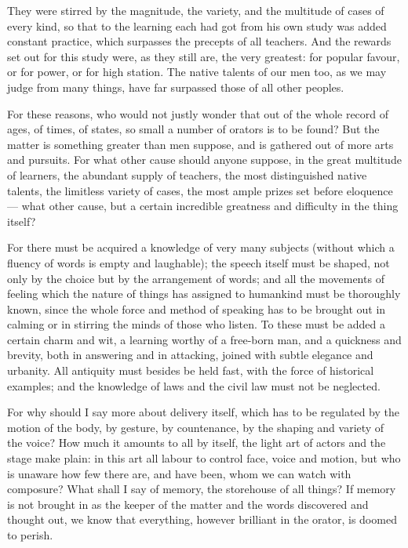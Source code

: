  They were stirred by the magnitude, the variety, and the multitude of cases of every kind, so that to the learning each had got from his own study was added constant practice, which surpasses the precepts of all teachers. And the rewards set out for this study were, as they still are, the very greatest: for popular favour, or for power, or for high station. The native talents of our men too, as we may judge from many things, have far surpassed those of all other peoples.

 For these reasons, who would not justly wonder that out of the whole record of ages, of times, of states, so small a number of orators is to be found? But the matter is something greater than men suppose, and is gathered out of more arts and pursuits. For what other cause should anyone suppose, in the great multitude of learners, the abundant supply of teachers, the most distinguished native talents, the limitless variety of cases, the most ample prizes set before eloquence — what other cause, but a certain incredible greatness and difficulty in the thing itself?

 For there must be acquired a knowledge of very many subjects (without which a fluency of words is empty and laughable); the speech itself must be shaped, not only by the choice but by the arrangement of words; and all the movements of feeling which the nature of things has assigned to humankind must be thoroughly known, since the whole force and method of speaking has to be brought out in calming or in stirring the minds of those who listen. To these must be added a certain charm and wit, a learning worthy of a free-born man, and a quickness and brevity, both in answering and in attacking, joined with subtle elegance and urbanity. All antiquity must besides be held fast, with the force of historical examples; and the knowledge of laws and the civil law must not be neglected.

 For why should I say more about delivery itself, which has to be regulated by the motion of the body, by gesture, by countenance, by the shaping and variety of the voice? How much it amounts to all by itself, the light art of actors and the stage make plain: in this art all labour to control face, voice and motion, but who is unaware how few there are, and have been, whom we can watch with composure? What shall I say of memory, the storehouse of all things? If memory is not brought in as the keeper of the matter and the words discovered and thought out, we know that everything, however brilliant in the orator, is doomed to perish.

